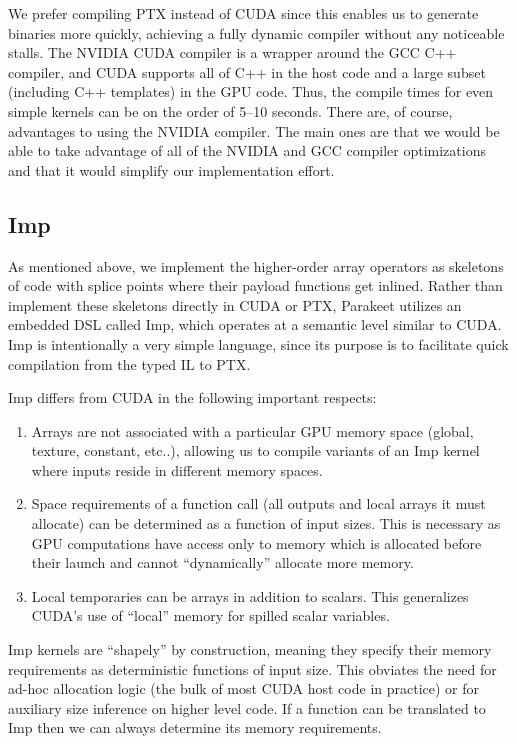 \documentclass[10pt,twocolumn]{article}
\begin{document}
We prefer compiling PTX instead of CUDA since this enables us to generate binaries more quickly, achieving a fully dynamic compiler without any noticeable stalls. The NVIDIA CUDA compiler is a wrapper around the GCC C++ compiler, and CUDA supports all of C++ in the host code and a large subset (including C++ templates) in the GPU code.  Thus, the compile times for even simple kernels can be on the order of 5--10 seconds.  There are, of course, advantages to using the NVIDIA compiler. The main ones are that we would be able to take advantage of all of the NVIDIA and GCC compiler optimizations and that it would simplify our implementation effort.  

\subsection{Imp}
\label{Imp}
As mentioned above, we implement the higher-order array operators as skeletons of code with splice points where their payload functions get inlined.  Rather than implement these skeletons directly in CUDA or PTX, Parakeet utilizes an embedded DSL called Imp, which operates at a semantic level similar to CUDA. Imp is intentionally a very simple language, since its purpose is to facilitate quick compilation from the typed IL to PTX. 

Imp differs from CUDA in the following important respects:

\begin{enumerate}
\item  Arrays are not associated with a particular GPU memory space (global, texture, constant, etc..), allowing us to compile variants of an Imp kernel where inputs reside in different memory spaces.

\item Space requirements of a function call (all outputs and local arrays it must allocate) can be determined as a function of input sizes. This is necessary as GPU computations have access only to memory which is allocated before their launch and cannot ``dynamically'' allocate more memory.

\item Local temporaries can be arrays in addition to scalars. This generalizes CUDA's use of ``local'' memory for spilled scalar variables.
\end{enumerate}
Imp kernels are ``shapely'' by construction, meaning they specify their memory requirements as deterministic functions of input size. This obviates the need for ad-hoc allocation logic (the bulk of most CUDA host code in practice) or for auxiliary size inference on higher level code. If a function can be translated to Imp then we can always determine its memory requirements.
\end{document}
